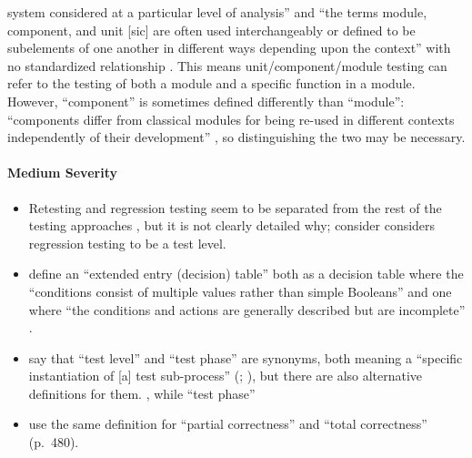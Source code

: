 \begin{itemize}
          system considered at a particular level of analysis''
          \citep{ISO_IEC2023b} and ``the terms module, component, and unit
              [sic] are often used interchangeably or defined to be subelements
          of one another in different ways depending upon the context'' with
          no standardized relationship \citep[p.~82]{IEEE2017}. This means
          unit/component/module testing can refer to the testing of both a
          module and a specific function in a module.
          However, ``component'' is sometimes defined differently than
          ``module'': ``components differ from classical modules for being
          re-used in different contexts independently of their development''
          \citep[p.~107]{BaresiAndPezzè2006}, so distinguishing the two
          may be necessary.
          \ifnotpaper
\end{itemize}

\paragraph{Medium Severity}
\begin{itemize}\fi
    \item Retesting and regression testing seem to be separated from the rest
          of the testing approaches \citep[p.~23]{IEEE2022}, but it is not
          clearly detailed why; \citet[p.~3]{BarbosaEtAl2006} \ifnotpaper
              consider \else considers \fi regression testing to be a test level.
          \ifnotpaper
    \item \citeauthor{IEEE2021} define an ``extended entry (decision) table''
          both as a decision table where the ``conditions consist of multiple
          values rather than simple Booleans'' \citeyearpar[p.~18]{IEEE2021}
          and one where ``the conditions and actions are generally described
          but are incomplete'' \citeyearpar[p.~175]{IEEE2017}.
    \item \citeauthor*{IEEE2017} say that ``test level'' and ``test phase''
          are synonyms, both meaning a ``specific instantiation of [a] test
          sub-process'' (\citeyear[pp.~469,~470]{IEEE2017};
          \citeyear[p.~9]{IEEE2013}), but there are also alternative
          definitions for them. \procLevel{\citeyearpar}, while
          ``test phase'' \phaseDef{}
    \item \citeauthor{IEEE2017} use the same definition for ``partial correctness''
          \citeyearpar[p.~314]{IEEE2017} and ``total correctness'' (p.~480).
          \fi
\end{itemize}

